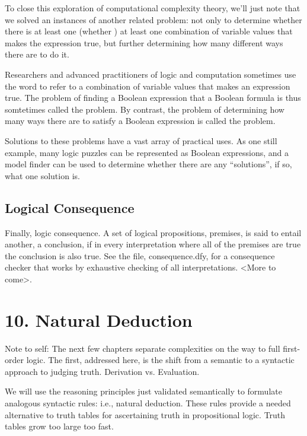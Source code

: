 \documentclass[letterpaper,10pt,english]{sphinxmanual}
\begin{document}
To close this exploration of computational complexity theory, we’ll
just note that we solved an instances of another related problem: not
only to determine whether there is at least one (whether ) at least one combination of variable values that makes the
expression true, but further determining how many different ways there
are to do it.

Researchers and advanced practitioners of logic and computation
sometimes use the word  to refer to a combination of variable
values that makes an expression true. The problem of finding a Boolean
expression that  a Boolean formula is thus somtetimes
called the  problem. By contrast, the problem of
determining how many ways there are to satisfy a Boolean expression is
called the  problem.

Solutions to these problems have a vast array of practical uses.  As
one still example, many logic puzzles can be represented as Boolean
expressions, and a model finder can be used to determine whether there
are any “solutions”, if so, what one solution is.


\section{Logical Consequence}
\label{\detokenize{09-propositional-logic:logical-consequence}}
Finally, logic consequence. A set of logical propositions, premises,
is said to entail another, a conclusion, if in every interpretation
where all of the premises are true the conclusion is also true. See
the file, consequence.dfy, for a consequence checker that works by
exhaustive checking of all interpretations. \textless{}More to come\textgreater{}.


\chapter{10. Natural Deduction}
\label{\detokenize{10-natural-deduction::doc}}\label{\detokenize{10-natural-deduction:natural-deduction}}
Note to self: The next few chapters separate complexities on the way
to full first-order logic. The first, addressed here, is the shift
from a semantic to a syntactic approach to judging truth. Derivation
vs. Evaluation.

We will use the reasoning principles just validated semantically to
formulate analogous syntactic rules: i.e., natural deduction. These
rules provide a needed alternative to truth tables for ascertaining
truth in propositional logic. Truth tables grow too large too fast.
\end{document}
